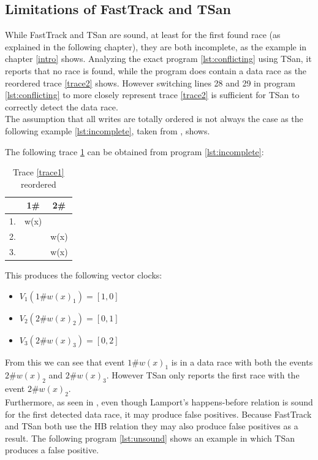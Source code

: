 \documentclass[12pt]{article}
\begin{document}
	\subsection{Limitations of FastTrack and TSan}
	While FastTrack and TSan are sound, at least for the first found race (as explained in the following chapter), they are both incomplete, as the example in chapter \ref{intro} shows. Analyzing the exact program \ref{lst:conflicting} using TSan, it reports that no race is found, while the program does contain a data race as the reordered trace \ref{trace2} shows. However switching lines 28 and 29 in program \ref{lst:conflicting} to more closely represent trace \ref{trace2} is sufficient for TSan to correctly detect the data race.\\
	The assumption that all writes are totally ordered is not always the case as the following example \ref{lst:incomplete}, taken from \cite[p. 10]{sulzmann2}, shows.\\
	\begin{minipage}{\linewidth}
		
	\end{minipage}
	The following trace \ref{trace4} can be obtained from program \ref{lst:incomplete}:
	\begin{table}[H]
		\begin{center}
			\begin{tabular}{ c c c}
				& 1\# & 2\# \\
				\hline
				1. & w(x) & \\
				2. & & w(x) \\
				3. & & w(x) \\
			\end{tabular}
			\caption{Trace \ref{trace1} reordered}
			\label{trace4}
		\end{center}
	\end{table}
	This produces the following vector clocks:
	\begin{itemize}
		\item $V_1(1\#w(x)_1) = [1,0]$
		\item $V_2(2\#w(x)_2) = [0,1]$
		\item $V_3(2\#w(x)_3) = [0,2]$
	\end{itemize}
	From this we can see that event $1\#w(x)_1$ is in a data race with both the events $2\#w(x)_2$ and $2\#w(x)_3$. However TSan only reports the first race with the event $2\#w(x)_2$.\\
	Furthermore, as seen in \cite[p. 2]{marthur}, even though Lamport's happens-before relation is sound for the first detected data race, it may produce false positives. Because FastTrack and TSan both use the HB relation they may also produce false positives as a result. The following program \ref{lst:unsound} shows an example in which TSan produces a false positive.
\end{document}
